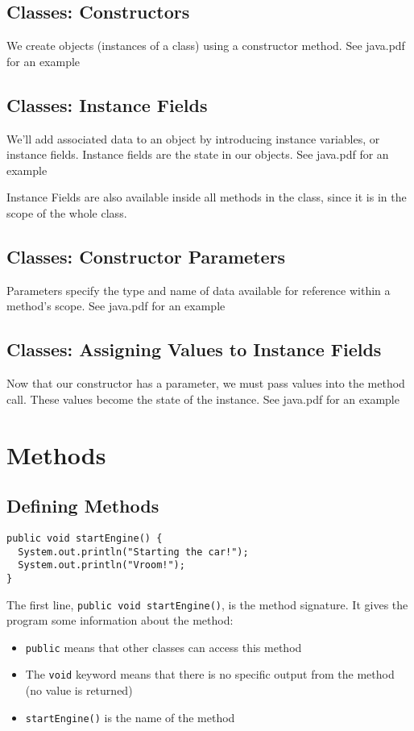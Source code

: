 \documentclass[a4paper, 12pt]{article}
\begin{document}
\subsection{Classes: Constructors}
We create objects (instances of a class) using a constructor method. See java.pdf for an example

\subsection{Classes: Instance Fields}
We'll add associated data to an object by introducing instance variables, or instance fields. Instance fields are the state in our objects. See java.pdf for an example

Instance Fields are also available inside all methods in the class, since it is in the scope of the whole class.

\subsection{Classes: Constructor Parameters}
Parameters specify the type and name of data available for reference within a method's scope. See java.pdf for an example

\subsection{Classes: Assigning Values to Instance Fields}
Now that our constructor has a parameter, we must pass values into the method call. These values become the state of the instance. See java.pdf for an example


\section{Methods}
\subsection{Defining Methods}
\begin{verbatim}
public void startEngine() {
  System.out.println("Starting the car!");
  System.out.println("Vroom!");
}
\end{verbatim}
The first line, \verb|public void startEngine()|, is the method signature. It gives the program some information about the method:
\begin{itemize}
\item \verb|public| means that other classes can access this method

\item The \verb|void| keyword means that there is no specific output from the method (no value is returned)

\item \verb|startEngine()| is the name of the method

\end{itemize}
\end{document}

